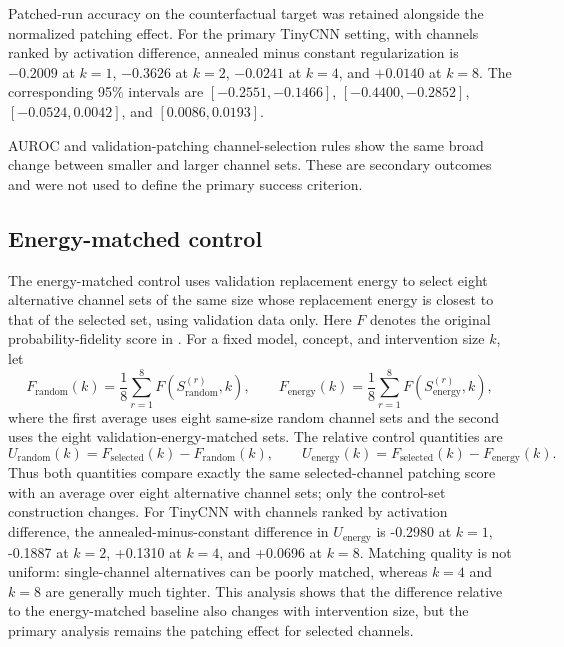 Patched-run accuracy on the counterfactual target was retained alongside the normalized patching effect. For the primary TinyCNN setting, with channels ranked by activation difference, annealed minus constant regularization is $-0.2009$ at $k=1$, $-0.3626$ at $k=2$, $-0.0241$ at $k=4$, and $+0.0140$ at $k=8$. The corresponding 95\% intervals are $[-0.2551,-0.1466]$, $[-0.4400,-0.2852]$, $[-0.0524,0.0042]$, and $[0.0086,0.0193]$.

AUROC and validation-patching channel-selection rules show the same broad change between smaller and larger channel sets. These are secondary outcomes and were not used to define the primary success criterion.

\subsection{Energy-matched control}\label{app:energy-control}

The energy-matched control uses validation replacement energy to select eight alternative channel sets of the same size whose replacement energy is closest to that of the selected set, using validation data only. Here $F$ denotes the original probability-fidelity score in . For a fixed model, concept, and intervention size $k$, let
\begin{equation}
F_{\mathrm{random}}(k)=\frac{1}{8}\sum_{r=1}^{8}F\!\left(S^{(r)}_{\mathrm{random}},k\right),
\qquad
F_{\mathrm{energy}}(k)=\frac{1}{8}\sum_{r=1}^{8}F\!\left(S^{(r)}_{\mathrm{energy}},k\right),
\label{eq:control-fidelity-averages}
\end{equation}
where the first average uses eight same-size random channel sets and the second uses the eight validation-energy-matched sets. The relative control quantities are
\begin{equation}
U_{\mathrm{random}}(k)=F_{\mathrm{selected}}(k)-F_{\mathrm{random}}(k),
\qquad
U_{\mathrm{energy}}(k)=F_{\mathrm{selected}}(k)-F_{\mathrm{energy}}(k).
\label{eq:control-usefulness}
\end{equation}
Thus both quantities compare exactly the same selected-channel patching score with an average over eight alternative channel sets; only the control-set construction changes. For TinyCNN with channels ranked by activation difference, the annealed-minus-constant difference in $U_{\mathrm{energy}}$ is -0.2980 at $k=1$, -0.1887 at $k=2$, +0.1310 at $k=4$, and +0.0696 at $k=8$. Matching quality is not uniform: single-channel alternatives can be poorly matched, whereas $k=4$ and $k=8$ are generally much tighter. This analysis shows that the difference relative to the energy-matched baseline also changes with intervention size, but the primary analysis remains the patching effect for selected channels.

